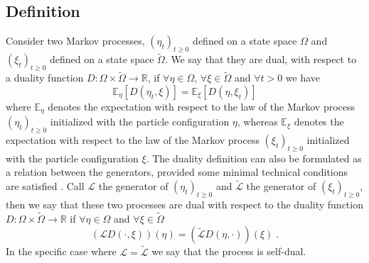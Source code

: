 \documentclass[10pt]{article}
\numberwithin{equation}{section}
\numberwithin{equation}{subsection}
\newcommand{\dt}{\;.}
\begin{document}
\subsection{Definition}
\label{def-duality}
Consider two Markov processes, $(\eta_{t})_{t\geq 0}$ defined on a state space $\Omega$ and $(\xi_{t})_{t\geq 0}$ defined on a state space $\widetilde{\Omega}$. We say that they are dual, with respect to a duality function $D:\Omega\times \widetilde{\Omega}\to \mathbb{R}$, if $\forall \eta\in\Omega$, $\forall \xi\in\widetilde{\Omega}$ and $\forall t> 0$ we have 
\begin{equation}\label{duality-expectation}
    \mathbb{E}_{\eta}\left[D(\eta_{t},\xi)\right]=\mathbb{E}_{\xi}\left[D(\eta,\xi_{t})\right]
\end{equation}
where $\mathbb{E}_{\eta}$ denotes the expectation with respect to the law of the Markov process $(\eta_{t})_{t\geq 0}$ initialized with the particle configuration $\eta$, whereas $\mathbb{E}_{\xi}$ denotes the expectation with respect to the law of the Markov process $(\xi_{t})_{t\geq 0}$ initialized with the particle configuration $\xi$.
The duality definition can also be formulated as a relation between the generators, provided some minimal technical conditions are satisfied \cite{jansen2014notion}. Call $\mathcal{L}$ the generator of $(\eta_{t})_{t\geq0}$ and $\widetilde{\mathcal{L}}$ the generator of $(\xi_{t})_{t\geq 0}$, then we say that these two processes are dual with respect to the duality function $D:\Omega\times \widetilde{\Omega}\to \mathbb{R}$ if $\forall \eta\in\Omega$ and $\forall \xi\in\widetilde{\Omega}$
\begin{equation}\label{dualityRelationGenerator}
    \left(\mathcal{L}D(\cdot,\xi)\right)(\eta)=\left(\widetilde{\mathcal{L}}D(\eta,\cdot)\right)(\xi)\dt
\end{equation}
In the specific case where $\mathcal{L}=\widetilde{\mathcal{L}}$ we say that the process is self-dual.
\end{document}

